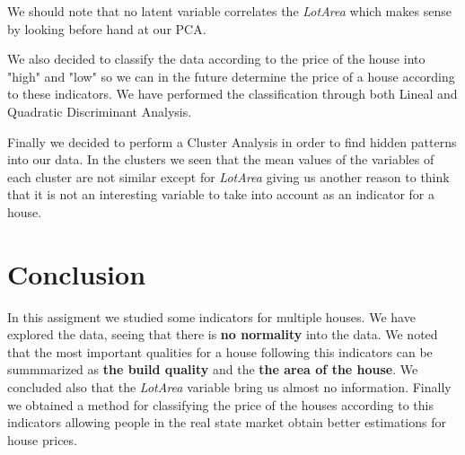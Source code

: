 \documentclass[12pt]{article}
\begin{document}
{We should note that no latent variable correlates the \textit{LotArea} which makes sense by looking before hand at our PCA.

We also decided to classify the data according to the price of the house into "high" and "low" so we can in the future determine the price of a house according to these indicators. We have performed the classification through both Lineal and Quadratic Discriminant Analysis.

Finally we decided to perform a Cluster Analysis in order to find hidden patterns into our data. In the clusters we seen that the mean values of the variables of each cluster are not similar except for \textit{LotArea} giving us another reason to think that it is not an interesting variable to take into account as an indicator for a house.
\section{Conclusion}
In this assigment we studied some indicators for multiple houses. We have explored the data, seeing that there is \textbf{no normality} into the data. We noted that the most important qualities for a house following this indicators can be summmarized as \textbf{the build quality} and the \textbf{the area of the house}. We concluded also that the \textit{LotArea} variable bring us almost no information. Finally we obtained a method for classifying the price of the houses according to this indicators allowing people in the real state market obtain better estimations for house prices.
}

\printbibliography
\end{document}
